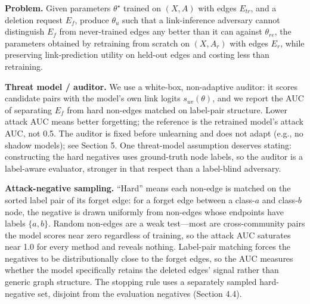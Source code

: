 \documentclass[pdflatex,sn-basic,Numbered]{sn-jnl}
\begin{document}
\textbf{Problem.} Given parameters $\theta^\star$ trained on $(X, A)$ with edges $E_{tr}$, and a deletion request $E_f$, produce $\theta_u$ such that a link-inference adversary cannot distinguish $E_f$ from never-trained edges any better than it can against $\theta_{re}$, the parameters obtained by retraining from scratch on $(X, A_r)$ with edges $E_r$, while preserving link-prediction utility on held-out edges and costing less than retraining.

\textbf{Threat model / auditor.} We use a white-box, non-adaptive auditor: it scores candidate pairs with the model's own link logits $s_{uv}(\theta)$, and we report the AUC of separating $E_f$ from hard non-edges matched on label-pair structure. Lower attack AUC means better forgetting; the reference is the retrained model's attack AUC, not 0.5. The auditor is fixed before unlearning and does not adapt (e.g., no shadow models); see Section 5. One threat-model assumption deserves stating: constructing the hard negatives uses ground-truth node labels, so the auditor is a label-aware evaluator, stronger in that respect than a label-blind adversary.

\textbf{Attack-negative sampling.} ``Hard'' means each non-edge is matched on the sorted label pair of its forget edge: for a forget edge between a class-$a$ and class-$b$ node, the negative is drawn uniformly from non-edges whose endpoints have labels $\{a, b\}$. Random non-edges are a weak test---most are cross-community pairs the model scores near zero regardless of training, so the attack AUC saturates near 1.0 for every method and reveals nothing. Label-pair matching forces the negatives to be distributionally close to the forget edges, so the AUC measures whether the model specifically retains the deleted edges' signal rather than generic graph structure. The stopping rule uses a separately sampled hard-negative set, disjoint from the evaluation negatives (Section 4.4).
\end{document}
